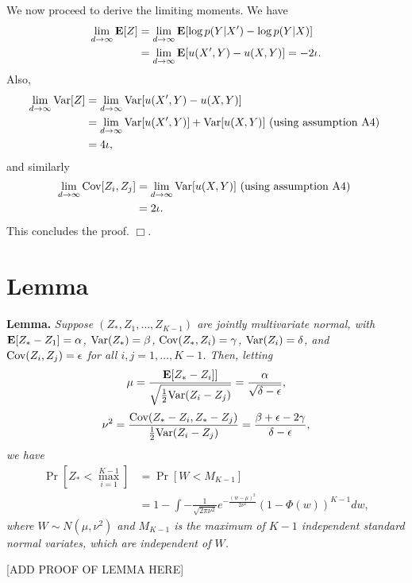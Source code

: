 \documentclass[12pt]{article}
\begin{document}
We now proceed to derive the limiting moments.
We have
\begin{align*}
\lim_{d \to \infty} \textbf{E}[Z] 
&= \lim_{d \to \infty} \textbf{E}[ \log p(Y|X') - \log p(Y|X)]
\\&= \lim_{d \to \infty} \textbf{E}[ u(X', Y) - u(X, Y) ] = -2\iota.
\end{align*}
Also,
\begin{align*}
\lim_{d \to \infty} \text{Var}[Z]
 &= \lim_{d \to \infty} \text{Var}[ u(X', Y) - u(X, Y) ]
\\&= \lim_{d \to \infty} \text{Var}[ u(X', Y)] +\text{Var}[ u(X, Y) ]\text{ (using assumption A4) }
\\&= 4\iota,
\end{align*}
and similarly
\begin{align*}
\lim_{d \to \infty} \text{Cov}[Z_i, Z_j]
&= \lim_{d \to \infty} \text{Var}[ u(X, Y)]\text{ (using assumption A4) }
\\&= 2\iota.
\end{align*}
This concludes the proof. $\Box$.


\section{Lemma}

\textbf{Lemma. }
\emph{
Suppose $(Z_*, Z_1, \hdots, Z_{K-1})$ are jointly multivariate normal, with 
$\textbf{E}[Z_* - Z_1]= \alpha$, 
$\text{Var}(Z_*) = \beta$, 
$\text{Cov}(Z_*, Z_i) = \gamma$, 
$\text{Var}(Z_i)= \delta$, and $\text{Cov}(Z_i, Z_j) = \epsilon$ for all $i, j = 1, \hdots,
K-1$.  Then, letting
\[
\mu = \frac{\textbf{E}[Z_* - Z_i]]}{\sqrt{\frac{1}{2}\text{Var}(Z_i - Z_j)}} = \frac{\alpha}{\sqrt{\delta - \epsilon}},
\]
\[
\nu^2 = \frac{\text{Cov}(Z_* -Z_i, Z_* - Z_j)}{\frac{1}{2}\text{Var}(Z_i - Z_j)} = \frac{\beta + \epsilon - 2\gamma}{\delta - \epsilon},
\]
we have
\begin{align*}
\Pr[Z_* < \max_{i=1}^{K-1}] &= \Pr[W < M_{K-1}]
\\&= 1 - \int -\frac{1}{\sqrt{2\pi\nu^2}} e^{-\frac{(w-\mu)^2}{2\nu^2}} (1-\Phi(w))^{K-1} dw,
\end{align*}
where $W \sim N(\mu, \nu^2)$ and $M_{K-1}$ is the maximum of $K-1$
independent standard normal variates, which are independent of $W$.
}

[ADD PROOF OF LEMMA HERE]
\end{document}
